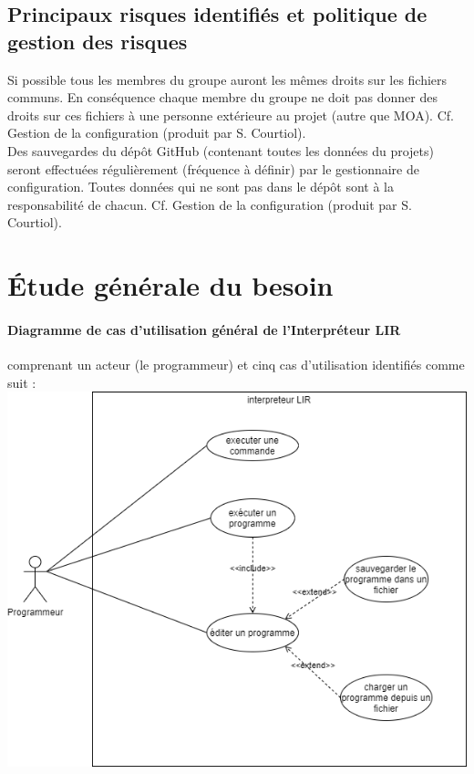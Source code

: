 \documentclass[11pt,a4paper,titlepage,openright]{report}
\begin{document}
    \subsection{Principaux risques identifiés et politique de gestion des risques}
    Si possible tous les membres du groupe auront les mêmes droits sur
    les fichiers communs. En conséquence chaque membre du groupe ne doit
    pas donner des droits sur ces fichiers à une personne extérieure au
    projet (autre que MOA). Cf. Gestion de la configuration (produit par
    S. Courtiol).
    \\Des sauvegardes du dépôt GitHub (contenant toutes les données du
    projets) seront effectuées régulièrement (fréquence à définir) par le
    gestionnaire de configuration. Toutes données qui ne sont pas dans le
    dépôt sont à la responsabilité de chacun. Cf. Gestion de la
    configuration (produit par S. Courtiol).

    \section{Étude générale du besoin}
    \paragraph{Diagramme de cas d'utilisation général de l'Interpréteur LIR}
    comprenant un acteur (le programmeur) et cinq cas d'utilisation
    identifiés comme suit :
    \\

    \includegraphics[width=\linewidth]{img/diagrammeDeCasUtilisation}
\end{document}
